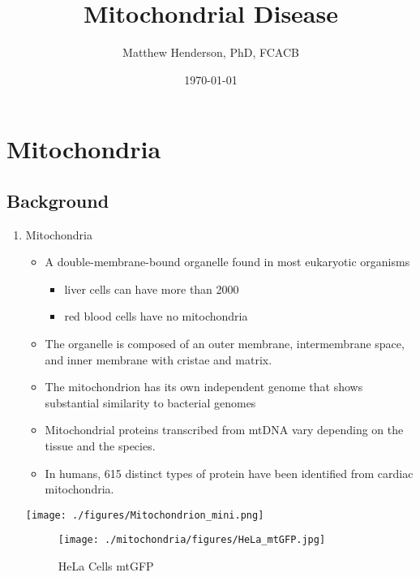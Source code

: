 \documentclass{scrartcl}
\author{Matthew Henderson, PhD, FCACB}
\date{\today}
\title{Mitochondrial Disease}
\begin{document}
\maketitle
\tableofcontents


\section{Mitochondria}
\label{sec:org8977277}
\subsection{Background}
\label{sec:orga7eb2e2}
\begin{enumerate}
\item Mitochondria
\label{sec:orge3fd243}
\begin{itemize}
\item A double-membrane-bound organelle found in most eukaryotic organisms
\begin{itemize}
\item liver cells can have more than 2000
\item red blood cells have no mitochondria
\end{itemize}

\item The organelle is composed of an outer membrane, intermembrane
space, and inner membrane with cristae and matrix.

\item The mitochondrion has its own independent genome that shows
substantial similarity to bacterial genomes

\item Mitochondrial proteins transcribed from mtDNA vary depending on the
tissue and the species.

\item In humans, 615 distinct types of protein have been identified from
cardiac mitochondria.
\end{itemize}

\begin{center}
\texttt{[image: ./figures/Mitochondrion\_mini.png]}
\end{center}


\begin{figure}[htbp]
\centering
\texttt{[image: ./mitochondria/figures/HeLa\_mtGFP.jpg]}
\caption[hela]{\label{fig:org1c28f8c}
HeLa Cells mtGFP}
\end{figure}


\end{enumerate}
\end{document}
